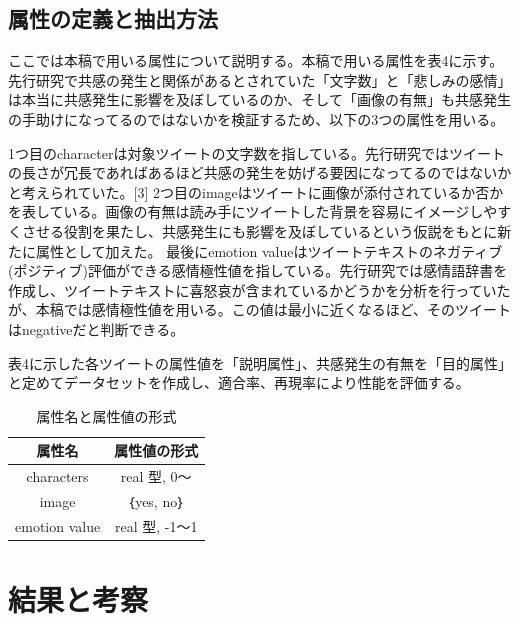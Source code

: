 \documentclass[dvipdfmx]{issj}
\begin{document}
\subsection{属性の定義と抽出方法}  %
ここでは本稿で用いる属性について説明する。本稿で用いる属性を表4に示す。
先行研究で共感の発生と関係があるとされていた「文字数」と「悲しみの感情」は本当に共感発生に影響を及ぼしているのか、そして「画像の有無」も共感発生の手助けになってるのではないかを検証するため、以下の3つの属性を用いる。

1つ目のcharacterは対象ツイートの文字数を指している。先行研究ではツイートの長さが冗長であればあるほど共感の発生を妨げる要因になってるのではないかと考えられていた。[3]
2つ目のimageはツイートに画像が添付されているか否かを表している。画像の有無は読み手にツイートした背景を容易にイメージしやすくさせる役割を果たし、共感発生にも影響を及ぼしているという仮説をもとに新たに属性として加えた。
最後にemotion valueはツイートテキストのネガティブ(ポジティブ)評価ができる感情極性値を指している。先行研究では感情語辞書を作成し、ツイートテキストに喜怒哀が含まれているかどうかを分析を行っていたが、本稿では感情極性値を用いる。この値は最小に近くなるほど、そのツイートはnegativeだと判断できる。

表4に示した各ツイートの属性値を「説明属性」、共感発生の有無を「目的属性」と定めてデータセットを作成し、適合率、再現率により性能を評価する。



\begin{table}[htbp]\centering
\caption{属性名と属性値の形式}\label{tbl:font}
\begin{small}
\begin{tabular}{|c|c|} \hline
属性名            & 属性値の形式\\\hline\hline
characters         & real 型, 0～\\\hline
image & ｛yes, no｝\\\hline
emotion value     &  real 型, -1～1\\\hline
\end{tabular}
\end{small}
\end{table}

\newpage


\section{結果と考察}  %
\end{document}
